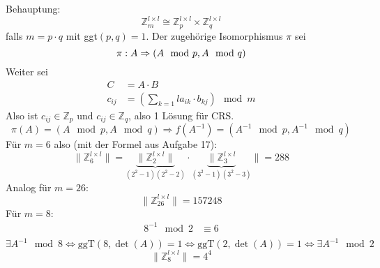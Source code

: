 \documentclass[main.tex]{subfiles}
\begin{document}
\subsection{}
Behauptung:
\begin{equation*}
  \mathbb{Z}_m^{l\times l} \cong  \mathbb{Z}_p^{l\times l} \times  \mathbb{Z}_q^{l\times l}
\end{equation*}
falls $m=p \cdot q$ mit ggt$(p,q) = 1$. Der zugehörige Isomorphismus $\pi$ sei
\begin{equation*}
  \pi:A \Rightarrow (A\mod p, A\mod q)\\
\end{equation*}
Weiter sei
\begin{align*}
  C &= A\cdot B\\
  c_{ij} &= \left(\sum_{k=1}{l}a_{ik}\cdot b_{kj}\right)\mod m 
\end{align*}
Also ist $c_{ij} \in \mathbb{Z}_p$ und $c_{ij} \in \mathbb{Z}_q$, also 1 Lösung für CRS.
\begin{equation*}
  \pi(A) = (A\mod p, A\mod q) \Rightarrow f(A^{-1}) = (A^{-1}\mod p, A^{-1}\mod q)
\end{equation*}
Für $m=6$ also (mit der Formel aus Aufgabe 17):
\begin{equation*}
  \|\mathbb{Z}_6^{l\times l} \| = \underbrace{\|\mathbb{Z}_2^{l\times l}\|}_{(2^2-1)(2^2-2)} \cdot  \underbrace{\|\mathbb{Z}_3^{l\times l}}_{(3^2-1)(3^2-3)}\| = 288
\end{equation*}
Analog für $m=26$:
\begin{equation*}
  \|\mathbb{Z}_{26}^{l\times l} \| = 157248
\end{equation*}
Für $m=8$:
\begin{align*}
  8^{-1} \mod 2 &\equiv 6\\
\end{align*}
\begin{equation*}
\exists A^{-1}\mod 8 \Leftrightarrow \text{ggT}(8, \det(A)) = 1 \Leftrightarrow \text{ggT}(2, \det(A)) = 1 \Leftrightarrow \exists A^{-1}\mod 2
\end{equation*}
\begin{equation*}
  \|\mathbb{Z}_8^{l\times l} \| = 4^4 
\end{equation*}
\subsection{}

\subsection{}
\end{document}
